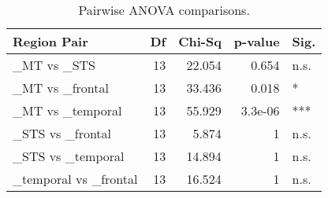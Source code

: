 \begin{table}[h]
\centering
\begin{tabular}{lrrrl}
\toprule
 Region Pair           &   Df &   Chi-Sq &   p-value & Sig.   \\
\midrule
 \_MT vs \_STS           &   13 &   22.054 &   0.654   & n.s.   \\
 \_MT vs \_frontal       &   13 &   33.436 &   0.018   & *      \\
 \_MT vs \_temporal      &   13 &   55.929 &   3.3e-06 & ***    \\
 \_STS vs \_frontal      &   13 &    5.874 &   1       & n.s.   \\
 \_STS vs \_temporal     &   13 &   14.894 &   1       & n.s.   \\
 \_temporal vs \_frontal &   13 &   16.524 &   1       & n.s.   \\
\bottomrule
\end{tabular}
\caption{Pairwise ANOVA comparisons.}
\end{table}
